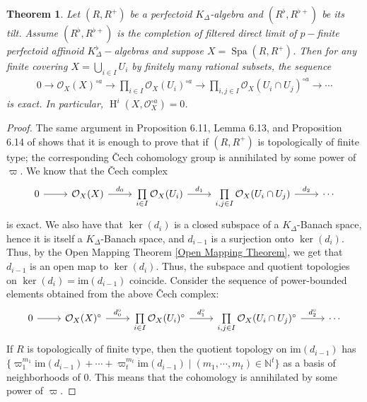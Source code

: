 \documentclass[12pts,a4paper]{amsart}
\newtheorem{theorem}[proposition]{Theorem}
\DeclareMathOperator{\spa}{Spa}
\DeclareMathOperator{\cH}{H}
\begin{document}
\begin{theorem}\label{IntegralTateAcyclicity}
    Let $(R,R^+)$ be a perfectoid $K_\Delta$-algebra and $(R^\flat,R^{\flat+})$ be its tilt. Assume $(R^\flat,R^{\flat+})$ is the completion of filtered direct limit of $p-$finite perfectoid affinoid $K^\flat_\Delta-$algebras and suppose $X=\spa(R,R^+)$. Then for any finite covering $X=\bigcup\limits_{i\in I}U_i$ by finitely many rational subsets, the sequence 
    \begin{align*}
        0\to \mathcal{O}_X(X)^{\circ a}\to \prod\limits_{i\in I}\mathcal{O}_X(U_i)^{\circ a}\to \prod\limits_{i,j\in I}\mathcal{O}_X(U_i\cap U_j)^{\circ a}\to\cdots
    \end{align*}
    is exact. In particular, $\cH^i(X,\mathcal{O}^{\circ a}_X)=0$.
\end{theorem}

\begin{proof}
    The same argument in Proposition 6.11, Lemma 6.13, and Proposition 6.14 of \cite{Sch} shows that it is enough to prove that if $(R,R^+)$ is topologically of finite type; the corresponding \v{C}ech cohomology group is annihilated by some power of $\varpi$. We know that the \v{C}ech complex
\[
\begin{tikzcd}
0\arrow[r] & \mathcal{O}_X(X)\arrow[r,"d_0"] & \prod\limits_{i\in I}\mathcal{O}_X(U_i)\arrow[r,"d_1"] & \prod\limits_{i,j\in I}\mathcal{O}_X(U_i\cap U_j)\arrow[r,"d_2"] &\cdots
\end{tikzcd}
\]
is exact. We also have that $\ker(d_i)$ is a closed subspace of a $K_\Delta$-Banach space, hence it is itself a $K_\Delta$-Banach space, and $d_{i-1}$ is a surjection onto $\ker(d_i)$. Thus, by the Open Mapping Theorem \ref{Open Mapping Theorem}, we get that $d_{i-1}$ is an open map to $\ker(d_i)$. Thus, the subspace and quotient topologies on $\ker(d_i)=\mathrm{im}(d_{i-1})$ coincide. Consider the sequence of power-bounded elements obtained from the above \v{C}ech complex:
\[
\begin{tikzcd}
0\arrow[r] &\mathcal{O}_X(X)^\circ \arrow[r,"d^\circ_0"] &\prod\limits_{i\in I}\mathcal{O}_X(U_i)^\circ \arrow[r,"d^\circ_1"] & \prod\limits_{i,j\in I}\mathcal{O}_X(U_i\cap U_j)^\circ \arrow[r,"d^\circ_2"] & \cdots
\end{tikzcd}
\]
If $R$ is topologically of finite type, then the quotient topology on $\mathrm{im}(d_{i-1})$ has $\{\varpi^{m_1}_1\mathrm{im}(d_{i-1})+\cdots+ \varpi^{m_t}_t\mathrm{im}(d_{i-1}) \mid (m_1,\cdots,m_t)\in\mathbb{N}^t\}$ as a basis of neighborhoods of $0$. This means that the cohomology is annihilated by some power of $\varpi$. 
\end{proof}
\end{document}
